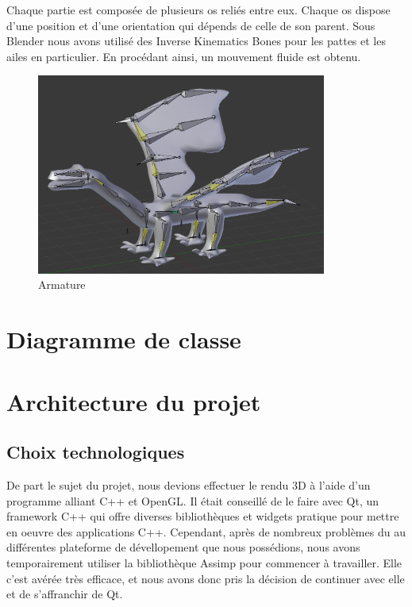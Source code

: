 \documentclass[a4paper]{report}
\begin{document}
Chaque partie est composée de plusieurs os reliés entre eux. Chaque os dispose d'une position et d'une orientation qui dépends de celle de son parent. Sous Blender nous avons utilisé des Inverse Kinematics Bones pour les pattes et les ailes en particulier. En procédant ainsi, un mouvement fluide est obtenu.

\begin{figure}[H]
    \begin{center}
        \includegraphics[width=0.85\textwidth]{armature.png}
        \caption{Armature}
    \end{center}
\end{figure}
\newpage
\chapter{Diagramme de classe}


\newpage
\chapter{Architecture du projet}
\section{Choix technologiques}
De part le sujet du projet, nous devions effectuer le rendu 3D à l'aide d'un programme alliant C++ et OpenGL. Il était conseillé de le faire avec Qt, un framework C++ qui offre diverses bibliothèques et widgets pratique pour mettre en oeuvre des applications C++. Cependant, après de nombreux problèmes du au différentes plateforme de dévellopement que nous possédions, nous avons temporairement utiliser la bibliothèque Assimp pour commencer à travailler. Elle c'est avérée très efficace, et nous avons donc pris la décision de continuer avec elle et de s'affranchir de Qt. 
\end{document}
